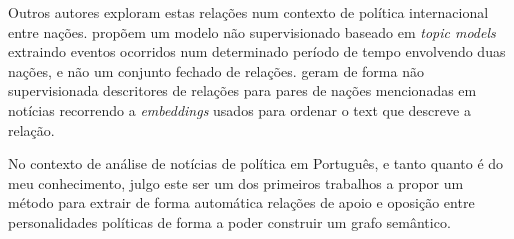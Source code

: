 \documentclass[a4paper, twocolumn, 11pt, twoside]{article}
\begin{document}
Outros autores exploram estas relações num contexto de política internacional entre nações. \cite{oconnor-etal-2013-learning} propõem um modelo não supervisionado baseado em \textit{topic models}~\cite{} extraindo eventos ocorridos num determinado período de tempo envolvendo duas nações, e não um conjunto fechado de relações. \cite{han-etal-2019-permanent} geram de forma não supervisionada descritores de relações para pares de nações mencionadas em notícias recorrendo a \textit{embeddings} usados para ordenar o text que descreve a relação.


No contexto de análise de notícias de política em Português, e tanto quanto é do meu conhecimento, julgo este ser um dos primeiros trabalhos a propor um método para extrair de forma automática relações de apoio e oposição entre personalidades políticas de forma a poder construir um grafo semântico.





\end{document}
